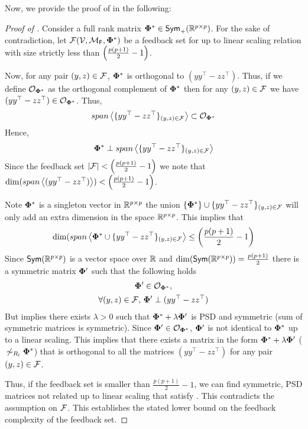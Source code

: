 Now, we provide the proof of  in the following:
\iffalse
\begin{proof}[Proof of ] 
    Consider a full rank matrix $\boldsymbol{\Phi}^* \in \textsf{Sym}_{+}(\mathbb{R}^{p\times p})$. For the sake of contradiction, let ${\mathcal{F}}({\mathcal{V}}, {\mathcal{M}}_{\textsf{F}}, \boldsymbol{\Phi}^*)$ be a feedback set for  up to linear scaling relation with size strictly less than $ \left( {\frac{p(p+1)}{2} - 1} \right) $.
    
    Now, for any pair $(y,z) \in {\mathcal{F}}$, $\boldsymbol{\Phi}^*$ is orthogonal to $(yy^{\top} - zz^{\top})$. Thus, if we define $\mathcal{O}_{\boldsymbol{\Phi}^*}$ as the orthogonal complement of $\boldsymbol{\Phi}^*$ then for any $(y,z) \in {\mathcal{F}}$ we have $(yy^{\top} - zz^{\top}) \in \mathcal{O}_{\boldsymbol{\Phi}^*}$. Thus,
    \begin{align*}
        span\left<\{yy^{\top} - zz^{\top}\}_{(y,z) \in {\mathcal{F}}}\right> \subset \mathcal{O}_{\boldsymbol{\Phi}^*}
    \end{align*}
    Hence,
    \begin{align*}
        \boldsymbol{\Phi}^* \perp span\left<\{yy^{\top} - zz^{\top}\}_{(y,z) \in {\mathcal{F}}}\right>
    \end{align*}
    Since the feedback set $|{\mathcal{F}}| <  \left( {\frac{p(p+1)}{2} - 1} \right) $ we note that $\dim (span\left<(yy^{\top} - zz^{\top})\right>) <  \left( {\frac{p(p+1)}{2} - 1} \right) $. 
    
    Note $\boldsymbol{\Phi}^*$ is a singleton vector in $\mathbb{R}^{p \times p}$ the union  $\left\{\boldsymbol{\Phi}^*\right\} \cup \{yy^{\top} - zz^{\top}\}_{(y,z) \in {\mathcal{F}}}$ will only add an extra dimension in the space $\mathbb{R}^{p \times p}$. This implies that
    \begin{align*}
        \dim(span\left<\boldsymbol{\Phi}^*\cup \{yy^{\top} - zz^{\top}\}_{(y,z) \in {\mathcal{F}}}\right> \le  \left( {\frac{p(p+1)}{2} - 1} \right) 
    \end{align*}
    Since $\textsf{Sym}(\mathbb{R}^{p\times p})$ is a vector space over $\mathbb{R}$ and $\dim(\textsf{Sym}(\mathbb{R}^{p\times p})) = \frac{p(p+1)}{2}$ there is a symmetric matrix $\boldsymbol{\Phi}'$ such that the following holds
    \begin{gather*}    
        \boldsymbol{\Phi}' \in \mathcal{O}_{\boldsymbol{\Phi}^*},\\
        \forall (y,z) \in {\mathcal{F}},\,  \boldsymbol{\Phi}' \perp (yy^{\top} - zz^{\top})
    \end{gather*}
    But  implies there exists $\lambda > 0$ such that $\boldsymbol{\Phi}^* + \lambda \boldsymbol{\Phi}'$ is PSD and symmetric (sum of symmetric matrices is symmetric). Since $\boldsymbol{\Phi}' \in \mathcal{O}_{\boldsymbol{\Phi}^*}$, $\boldsymbol{\Phi}'$ is not identical to $\boldsymbol{\Phi}^*$ up to a linear scaling. This implies that there exists a matrix in the form $\boldsymbol{\Phi}^* + \lambda \boldsymbol{\Phi}'$ ($\,\not \sim_{R_l} \boldsymbol{\Phi}^*$) that is orthogonal to all the matrices $(yy^{\top} - zz^{\top})$ for any pair $(y,z) \in {\mathcal{F}}$.
    
    Thus, if the feedback set is smaller than $\frac{p(p+1)}{2} - 1$, we can find symmetric, PSD matrices not related up to linear scaling that satisfy . This contradicts the assumption on ${\mathcal{F}}$. This establishes the stated lower bound on the feedback complexity of the feedback set.
\end{proof}

